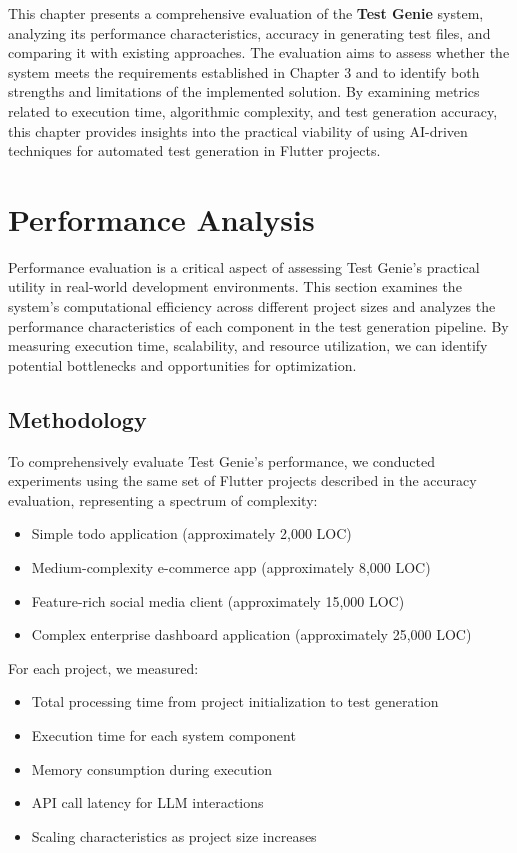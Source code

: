 This chapter presents a comprehensive evaluation of the \textbf{Test Genie} system, analyzing its performance characteristics, accuracy in generating test files, and comparing it with existing approaches. The evaluation aims to assess whether the system meets the requirements established in Chapter 3 and to identify both strengths and limitations of the implemented solution. By examining metrics related to execution time, algorithmic complexity, and test generation accuracy, this chapter provides insights into the practical viability of using AI-driven techniques for automated test generation in Flutter projects.

\section{Performance Analysis}

Performance evaluation is a critical aspect of assessing Test Genie's practical utility in real-world development environments. This section examines the system's computational efficiency across different project sizes and analyzes the performance characteristics of each component in the test generation pipeline. By measuring execution time, scalability, and resource utilization, we can identify potential bottlenecks and opportunities for optimization.

\subsection{Methodology}

To comprehensively evaluate Test Genie's performance, we conducted experiments using the same set of Flutter projects described in the accuracy evaluation, representing a spectrum of complexity:

\begin{itemize}
    \item Simple todo application (approximately 2,000 LOC)
    \item Medium-complexity e-commerce app (approximately 8,000 LOC)
    \item Feature-rich social media client (approximately 15,000 LOC)
    \item Complex enterprise dashboard application (approximately 25,000 LOC)
\end{itemize}

For each project, we measured:
\begin{itemize}
    \item Total processing time from project initialization to test generation
    \item Execution time for each system component
    \item Memory consumption during execution
    \item API call latency for LLM interactions
    \item Scaling characteristics as project size increases
\end{itemize}

